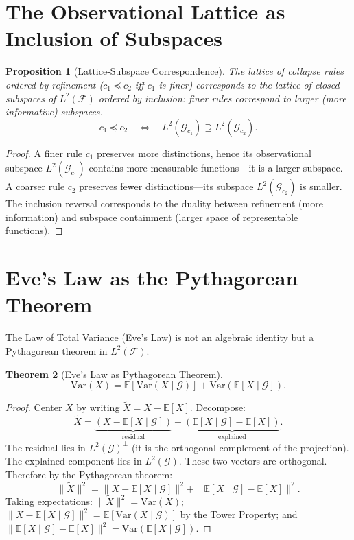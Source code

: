 \documentclass[12pt, a4paper, openany]{book}
\theoremstyle{plain}
\newtheorem{theorem}{Theorem}[chapter]
\newtheorem{proposition}[theorem]{Proposition}
\theoremstyle{definition}
\theoremstyle{remark}
\begin{document}
\section{The Observational Lattice as Inclusion of Subspaces}

\begin{proposition}[Lattice-Subspace Correspondence]
The lattice of collapse rules ordered by refinement ($c_1 \preceq c_2$ iff
$c_1$ is finer) corresponds to the lattice of closed subspaces of $L^2(\mathcal{F})$
ordered by inclusion: finer rules correspond to larger (more informative)
subspaces.
\[
c_1 \preceq c_2 \quad \iff \quad L^2(\mathcal{G}_{c_1}) \supseteq L^2(\mathcal{G}_{c_2}).
\]
\end{proposition}

\begin{proof}
A finer rule $c_1$ preserves more distinctions, hence its observational subspace
$L^2(\mathcal{G}_{c_1})$ contains more measurable functions---it is a larger
subspace. A coarser rule $c_2$ preserves fewer distinctions---its subspace
$L^2(\mathcal{G}_{c_2})$ is smaller. The inclusion reversal corresponds to the
duality between refinement (more information) and subspace containment (larger
space of representable functions).
\end{proof}

\section{Eve's Law as the Pythagorean Theorem}

The Law of Total Variance (Eve's Law) is not an algebraic identity but a
Pythagorean theorem in $L^2(\mathcal{F})$.

\begin{theorem}[Eve's Law as Pythagorean Theorem]
\[
\mathrm{Var}(X) = \mathbb{E}[\mathrm{Var}(X \mid \mathcal{G})] + \mathrm{Var}(\mathbb{E}[X \mid \mathcal{G}]).
\]
\end{theorem}

\begin{proof}
Center $X$ by writing $\tilde{X} = X - \mathbb{E}[X]$. Decompose:
\[
\tilde{X} = \underbrace{(X - \mathbb{E}[X \mid \mathcal{G}])}_{\text{residual}} +
            \underbrace{(\mathbb{E}[X \mid \mathcal{G}] - \mathbb{E}[X])}_{\text{explained}}.
\]
The residual lies in $L^2(\mathcal{G})^\perp$ (it is the orthogonal complement
of the projection). The explained component lies in $L^2(\mathcal{G})$. These
two vectors are orthogonal. Therefore by the Pythagorean theorem:
\[
\|\tilde{X}\|^2 = \|X - \mathbb{E}[X\mid\mathcal{G}]\|^2 +
                  \|\mathbb{E}[X\mid\mathcal{G}] - \mathbb{E}[X]\|^2.
\]
Taking expectations: $\|\tilde{X}\|^2 = \mathrm{Var}(X)$;
$\|X - \mathbb{E}[X\mid\mathcal{G}]\|^2 = \mathbb{E}[\mathrm{Var}(X\mid\mathcal{G})]$
by the Tower Property; and $\|\mathbb{E}[X\mid\mathcal{G}] - \mathbb{E}[X]\|^2 =
\mathrm{Var}(\mathbb{E}[X\mid\mathcal{G}])$.
\end{proof}
\end{document}
